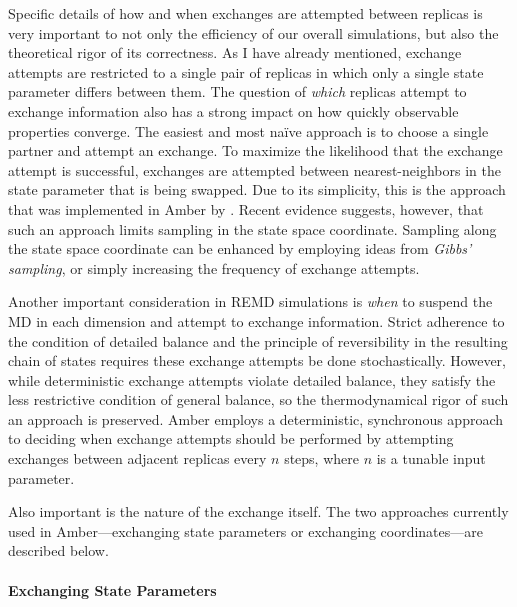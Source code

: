 Specific details of how and when exchanges are attempted between replicas is
very important to not only the efficiency of our overall simulations, but also
the theoretical rigor of its correctness. As I have already mentioned, exchange
attempts are restricted to a single pair of replicas in which only a single
state parameter differs between them. The question of \emph{which} replicas
attempt to exchange information also has a strong impact on how quickly
observable properties converge. The easiest and most na\"ive approach is to
choose a single partner and attempt an exchange. To maximize the likelihood that
the exchange attempt is successful, exchanges are attempted between
nearest-neighbors in the state parameter that is being swapped. Due to its
simplicity, this is the approach that was implemented in Amber by
\citeauthor{Cheng2005}. \cite{Cheng2005} Recent evidence suggests, however, that
such an approach limits sampling in the state space coordinate.
\cite{Chodera_JChemPhys_2011_v135_p194110} Sampling along the state space
coordinate can be enhanced by employing ideas from \emph{Gibbs' sampling},
\cite{Chodera_JChemPhys_2011_v135_p194110} or simply increasing the frequency
of exchange attempts. \cite{Sindhikara2008, Sindhikara2010}

Another important consideration in REMD simulations is \emph{when} to suspend
the MD in each dimension and attempt to exchange information. Strict adherence
to the condition of detailed balance and the principle of reversibility in the
resulting chain of states requires these exchange attempts be done
stochastically. \cite{Chodera_JChemPhys_2011_v135_p194110} However, while
deterministic exchange attempts violate detailed balance, they satisfy the less
restrictive condition of general balance, so the thermodynamical rigor of such
an approach is preserved. \cite{Chodera_JChemPhys_2011_v135_p194110} Amber
employs a deterministic, synchronous approach to deciding when exchange attempts
should be performed by attempting exchanges between adjacent replicas every $n$
steps, where $n$ is a tunable input parameter.

Also important is the nature of the exchange itself. The two approaches
currently used in Amber---exchanging state parameters or exchanging
coordinates---are described below.

\paragraph{Exchanging State Parameters}

